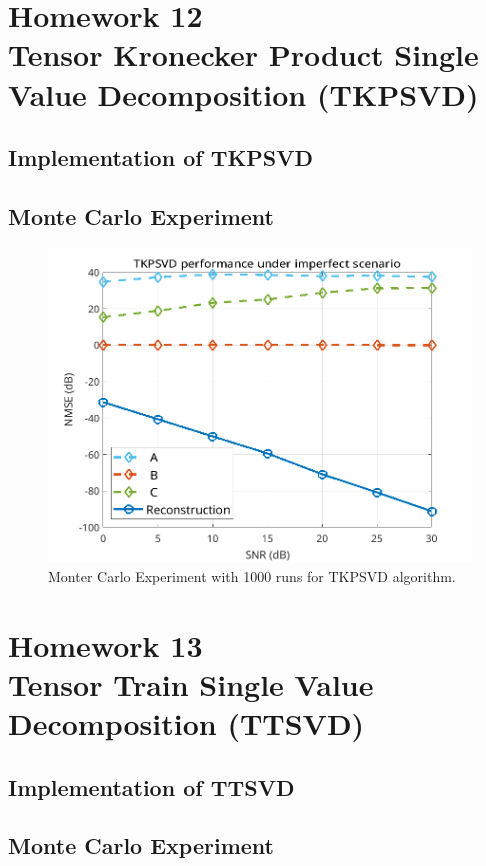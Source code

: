 \documentclass[a4paper,10pt]{article}
\begin{document}
\newpage
\section*{Homework 12 \\ Tensor Kronecker Product Single Value Decomposition (TKPSVD)}

    \subsection*{Implementation of TKPSVD}

    \subsection*{Monte Carlo Experiment}

    \begin{figure}[ht!]
        \centering 
        \includegraphics[width=0.75\linewidth]{figs/hw12.png} \par 
        \caption{Monter Carlo Experiment with 1000 runs for TKPSVD algorithm.}
        \label{fig:hw12} 
    \end{figure}

\newpage
\section*{Homework 13 \\ Tensor Train Single Value Decomposition (TTSVD)}

    \subsection*{Implementation of TTSVD}

    \subsection*{Monte Carlo Experiment}
\end{document}
